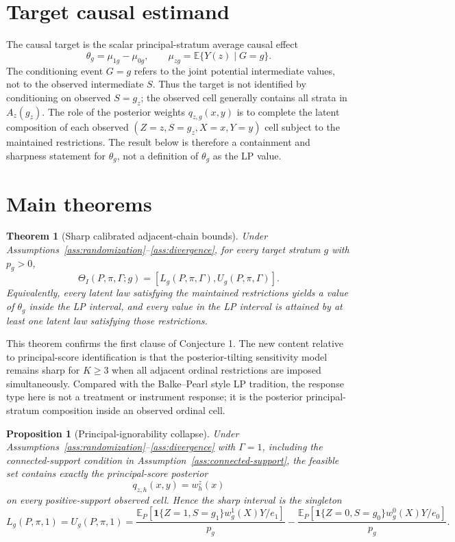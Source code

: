 \documentclass[11pt]{article}
\newcommand{\E}{\mathbb{E}}
\newcommand{\one}{\mathbf{1}}
\theoremstyle{definition}
\theoremstyle{plain}
\newtheorem{theorem}{Theorem}
\newtheorem{proposition}{Proposition}
\theoremstyle{remark}
\begin{document}
\section{Target causal estimand}
The causal target is the scalar principal-stratum average causal effect
\[
  \theta_g=\mu_{1g}-\mu_{0g},
  \qquad
  \mu_{zg}=\E\{Y(z)\mid G=g\}.
\]
The conditioning event \(G=g\) refers to the joint potential intermediate
values, not to the observed intermediate \(S\).  Thus the target is not
identified by conditioning on observed \(S=g_z\); the observed cell generally
contains all strata in \(A_z(g_z)\).  The role of the posterior weights
\(q_{z,g}(x,y)\) is to complete the latent composition of each observed
\((Z=z,S=g_z,X=x,Y=y)\) cell subject to the maintained restrictions.  The
result below is therefore a containment and sharpness statement for
\(\theta_g\), not a definition of \(\theta_g\) as the LP value.

\section{Main theorems}
\begin{theorem}[Sharp calibrated adjacent-chain bounds]\label{thm:sharp-chain}
Under Assumptions~\ref{ass:randomization}--\ref{ass:divergence}, for every
target stratum \(g\) with \(p_g>0\),
\[
  \Theta_I(P,\pi,\Gamma;g)
  =
  [L_g(P,\pi,\Gamma),U_g(P,\pi,\Gamma)].
\]
Equivalently, every latent law satisfying the maintained restrictions yields a
value of \(\theta_g\) inside the LP interval, and every value in the LP interval
is attained by at least one latent law satisfying those restrictions.
\end{theorem}

This theorem confirms the first clause of Conjecture 1.
The new content relative to principal-score identification is that the
posterior-tilting sensitivity model remains sharp for \(K\ge3\) when all
adjacent ordinal restrictions are imposed simultaneously.  Compared with the
Balke--Pearl style LP tradition, the response type here is not a treatment or
instrument response; it is the posterior principal-stratum composition inside
an observed ordinal cell.

\begin{proposition}[Principal-ignorability collapse]\label{prop:pi-collapse}
Under Assumptions~\ref{ass:randomization}--\ref{ass:divergence} with
\(\Gamma=1\), including the connected-support condition in
Assumption~\ref{ass:connected-support}, the feasible set contains exactly the
principal-score posterior
\[
  q_{z,h}(x,y)=w^z_h(x)
\]
on every positive-support observed cell.  Hence the sharp interval is the
singleton
\[
  L_g(P,\pi,1)=U_g(P,\pi,1)
  =
  \frac{\E_P[\one\{Z=1,S=g_1\}w^1_g(X)Y/e_1]}{p_g}
  -
  \frac{\E_P[\one\{Z=0,S=g_0\}w^0_g(X)Y/e_0]}{p_g}.
\]
\end{proposition}
\end{document}
